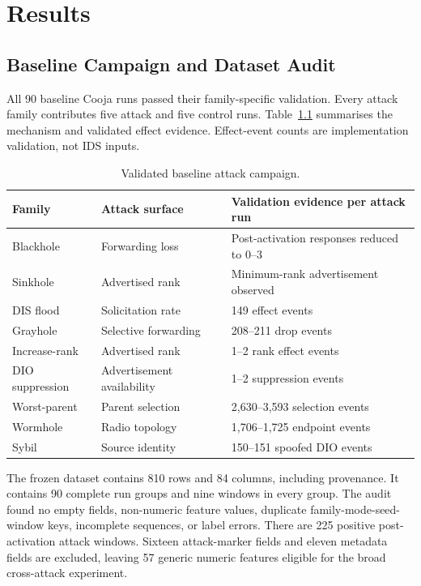 \chapter{Results}
\label{chap:results}

\section{Baseline Campaign and Dataset Audit}

All 90 baseline Cooja runs passed their family-specific validation. Every attack family contributes five attack and five control runs. Table~\ref{tab:attack-summary} summarises the mechanism and validated effect evidence. Effect-event counts are implementation validation, not IDS inputs.

\begin{table}[H]
\centering
\caption{Validated baseline attack campaign.}
\label{tab:attack-summary}
\begin{tabularx}{\textwidth}{p{}p{}X}
\toprule
Family & Attack surface & Validation evidence per attack run \\
\midrule
Blackhole & Forwarding loss & Post-activation responses reduced to 0--3 \\
Sinkhole & Advertised rank & Minimum-rank advertisement observed \\
DIS flood & Solicitation rate & 149 effect events \\
Grayhole & Selective forwarding & 208--211 drop events \\
Increase-rank & Advertised rank & 1--2 rank effect events \\
DIO suppression & Advertisement availability & 1--2 suppression events \\
Worst-parent & Parent selection & 2,630--3,593 selection events \\
Wormhole & Radio topology & 1,706--1,725 endpoint events \\
Sybil & Source identity & 150--151 spoofed DIO events \\
\bottomrule
\end{tabularx}
\end{table}

The frozen dataset contains 810 rows and 84 columns, including provenance. It contains 90 complete run groups and nine windows in every group. The audit found no empty fields, non-numeric feature values, duplicate family-mode-seed-window keys, incomplete sequences, or label errors. There are 225 positive post-activation attack windows. Sixteen attack-marker fields and eleven metadata fields are excluded, leaving 57 generic numeric features eligible for the broad cross-attack experiment.

